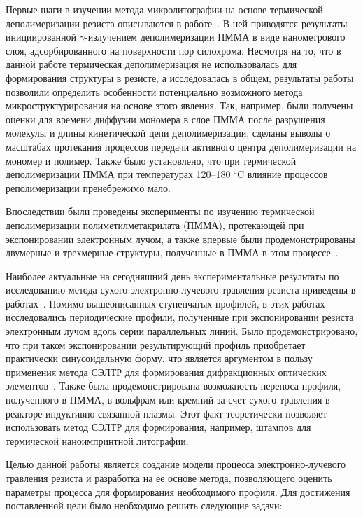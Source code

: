 \previouswork

Первые шаги в изучении метода микролитографии на основе термической деполимеризации резиста описываются в работе~\cite{Bruk_2000}. В ней приводятся результаты инициированной $\gamma$-излучением деполимеризации ПММА в виде нанометрового слоя, адсорбированного на поверхности пор силохрома. Несмотря на то, что в данной работе термическая деполимеризация не использовалась для формирования структуры в резисте, а исследовалась в общем, результаты работы позволили определить особенности потенциально возможного метода микроструктурирования на основе этого явления. Так, например, были получены оценки для времени диффузии мономера в слое ПММА после разрушения молекулы и длины кинетической цепи деполимеризации, сделаны выводы о масштабах протекания процессов передачи активного центра деполимеризации на мономер и полимер. Также было установлено, что при термической деполимеризации ПММА при температурах 120--180 $^\circ$C влияние процессов реполимеризации пренебрежимо мало.

Впоследствии были проведены эксперименты по изучению термической деполимеризации полиметилметакрилата (ПММА), протекающей при экспонировании электронным лучом, а также впервые были продемонстрированы двумерные и трехмерные структуры, полученные в ПММА в этом процессе~\cite{Bruk_2013}.

Наиболее актуальные на сегодняшний день экспериментальные результаты по исследованию метода сухого электронно-лучевого травления резиста приведены в работах~\cite{Bruk_2015_co, Bruk_2016_mee}. Помимо вышеописанных ступенчатых профилей, в этих работах исследовались периодические профили, полученные при экспонировании резиста электронным лучом вдоль серии параллельных линий. Было продемонстрировано, что при таком экспонировании результирующий профиль приобретает практически синусоидальную форму, что является аргументом в пользу применения метода СЭЛТР для формирования дифракционных оптических элементов~\cite{Mitreska_sin_gratings}. Также была продемонстрирована возможность переноса профиля, полученного в ПММА, в вольфрам или кремний за счет сухого травления в реакторе индуктивно-связанной плазмы. Этот факт теоретически позволяет использовать метод СЭЛТР для формирования, например, штампов для термической наноимпринтной литографии.


\aimsandtasks

Целью данной работы является создание модели процесса электронно-лучевого травления резиста и разработка на ее основе метода, позволяющего оценить параметры процесса для формирования необходимого профиля. Для достижения поставленной цели было необходимо решить следующие задачи:

